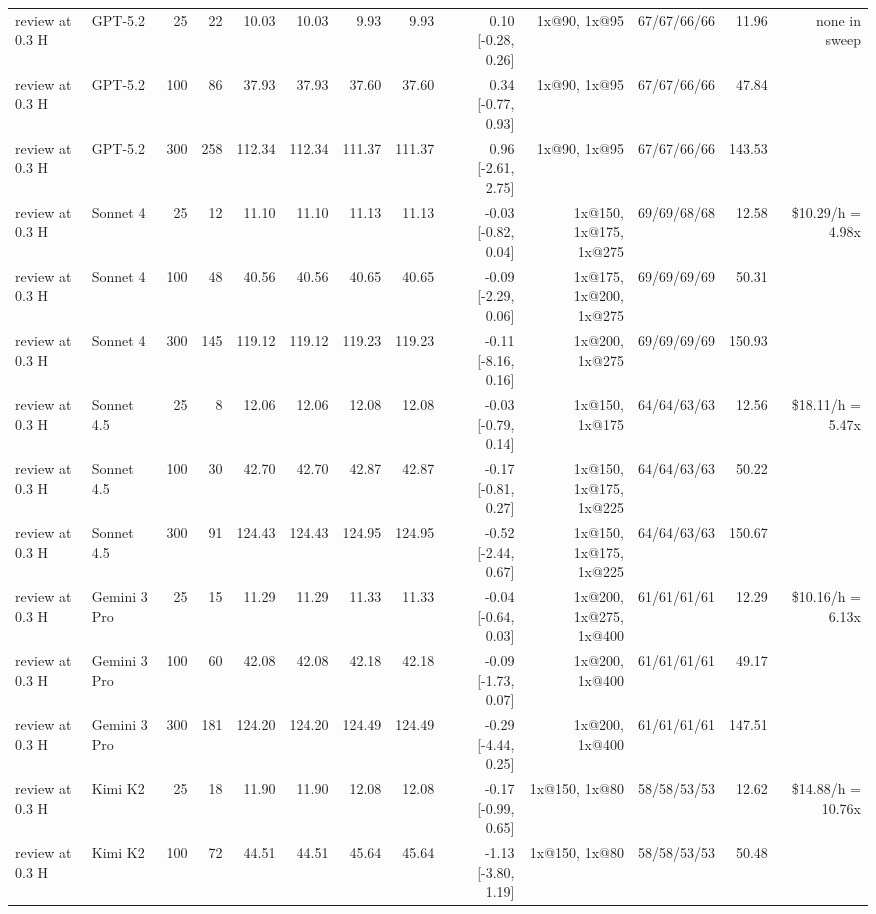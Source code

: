 \begin{table}[t]
\begin{tabular}{llrrrrrrrrrrr}
review at 0.3 H & GPT-5.2 & 25 & 22 & 10.03 & 10.03 & 9.93 & 9.93 & 0.10 [-0.28, 0.26] & 1x@90, 1x@95 & 67/67/66/66 & 11.96 & none in sweep \\
review at 0.3 H & GPT-5.2 & 100 & 86 & 37.93 & 37.93 & 37.60 & 37.60 & 0.34 [-0.77, 0.93] & 1x@90, 1x@95 & 67/67/66/66 & 47.84 &  \\
review at 0.3 H & GPT-5.2 & 300 & 258 & 112.34 & 112.34 & 111.37 & 111.37 & 0.96 [-2.61, 2.75] & 1x@90, 1x@95 & 67/67/66/66 & 143.53 &  \\
review at 0.3 H & Sonnet 4 & 25 & 12 & 11.10 & 11.10 & 11.13 & 11.13 & -0.03 [-0.82, 0.04] & 1x@150, 1x@175, 1x@275 & 69/69/68/68 & 12.58 & \$10.29/h = 4.98x \\
review at 0.3 H & Sonnet 4 & 100 & 48 & 40.56 & 40.56 & 40.65 & 40.65 & -0.09 [-2.29, 0.06] & 1x@175, 1x@200, 1x@275 & 69/69/69/69 & 50.31 &  \\
review at 0.3 H & Sonnet 4 & 300 & 145 & 119.12 & 119.12 & 119.23 & 119.23 & -0.11 [-8.16, 0.16] & 1x@200, 1x@275 & 69/69/69/69 & 150.93 &  \\
review at 0.3 H & Sonnet 4.5 & 25 & 8 & 12.06 & 12.06 & 12.08 & 12.08 & -0.03 [-0.79, 0.14] & 1x@150, 1x@175 & 64/64/63/63 & 12.56 & \$18.11/h = 5.47x \\
review at 0.3 H & Sonnet 4.5 & 100 & 30 & 42.70 & 42.70 & 42.87 & 42.87 & -0.17 [-0.81, 0.27] & 1x@150, 1x@175, 1x@225 & 64/64/63/63 & 50.22 &  \\
review at 0.3 H & Sonnet 4.5 & 300 & 91 & 124.43 & 124.43 & 124.95 & 124.95 & -0.52 [-2.44, 0.67] & 1x@150, 1x@175, 1x@225 & 64/64/63/63 & 150.67 &  \\
review at 0.3 H & Gemini 3 Pro & 25 & 15 & 11.29 & 11.29 & 11.33 & 11.33 & -0.04 [-0.64, 0.03] & 1x@200, 1x@275, 1x@400 & 61/61/61/61 & 12.29 & \$10.16/h = 6.13x \\
review at 0.3 H & Gemini 3 Pro & 100 & 60 & 42.08 & 42.08 & 42.18 & 42.18 & -0.09 [-1.73, 0.07] & 1x@200, 1x@400 & 61/61/61/61 & 49.17 &  \\
review at 0.3 H & Gemini 3 Pro & 300 & 181 & 124.20 & 124.20 & 124.49 & 124.49 & -0.29 [-4.44, 0.25] & 1x@200, 1x@400 & 61/61/61/61 & 147.51 &  \\
review at 0.3 H & Kimi K2 & 25 & 18 & 11.90 & 11.90 & 12.08 & 12.08 & -0.17 [-0.99, 0.65] & 1x@150, 1x@80 & 58/58/53/53 & 12.62 & \$14.88/h = 10.76x \\
review at 0.3 H & Kimi K2 & 100 & 72 & 44.51 & 44.51 & 45.64 & 45.64 & -1.13 [-3.80, 1.19] & 1x@150, 1x@80 & 58/58/53/53 & 50.48 &  \\

\end{tabular}
\end{table}
